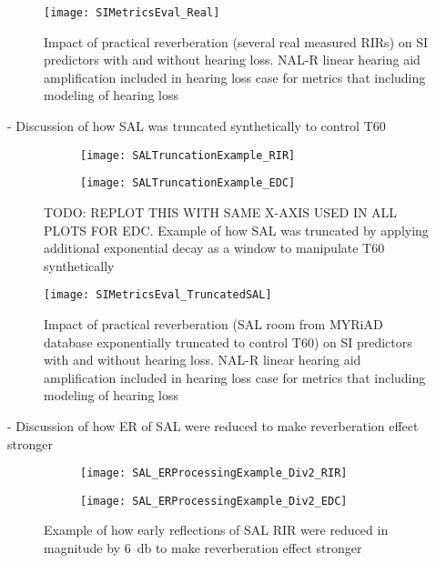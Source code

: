 \begin{figure}[H]
	\texttt{[image: SIMetricsEval\_Real]}
	\centering
	\caption{Impact of practical reverberation (several real measured RIRs) on SI predictors with and without hearing loss. NAL-R linear hearing aid amplification included in hearing loss case for metrics that including modeling of hearing loss}
	\label{fig:SIMetricsEval_Real}
\end{figure}

- Discussion of how SAL was truncated synthetically to control T60

\begin{figure}[H]
	\centering
	\begin{subfigure}[b]{0.49\textwidth}
		\centering
		\texttt{[image: SALTruncationExample\_RIR]}
	\end{subfigure}
	\hfill
	\begin{subfigure}[b]{0.49\textwidth}
		\centering
		\texttt{[image: SALTruncationExample\_EDC]}
	\end{subfigure}
	\hfill
	\caption{TODO: REPLOT THIS WITH SAME X-AXIS USED IN ALL PLOTS FOR EDC. Example of how SAL was truncated by applying additional exponential decay as a window to manipulate T60 synthetically}
	\label{fig:SALTruncationExample}
\end{figure}

\begin{figure}[H]
	\texttt{[image: SIMetricsEval\_TruncatedSAL]}
	\centering
	\caption{Impact of practical reverberation (SAL room from MYRiAD database exponentially truncated to control T60) on SI predictors with and without hearing loss. NAL-R linear hearing aid amplification included in hearing loss case for metrics that including modeling of hearing loss}
	\label{fig:SIMetricsEval_TruncatedSAL}
\end{figure}

- Discussion of how ER of SAL were reduced to make reverberation effect stronger


\begin{figure}[H]
	\centering
	\begin{subfigure}[b]{0.49\textwidth}
		\centering
		\texttt{[image: SAL\_ERProcessingExample\_Div2\_RIR]}
	\end{subfigure}
	\hfill
	\begin{subfigure}[b]{0.49\textwidth}
		\centering
		\texttt{[image: SAL\_ERProcessingExample\_Div2\_EDC]}
	\end{subfigure}
	\caption{Example of how early reflections of SAL RIR were reduced in magnitude by \qty{6}{\decibel} to make reverberation effect stronger}
	\label{fig:SAL_ERProcessing_Div2}
\end{figure}

